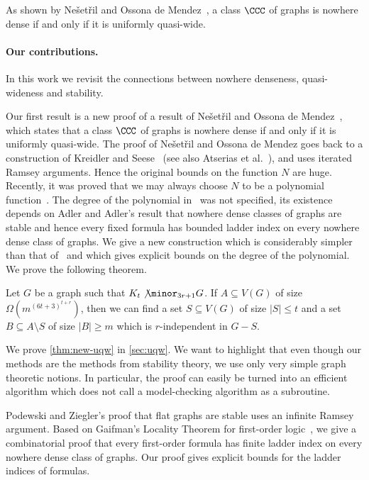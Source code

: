 As shown by Ne\v{s}et\v{r}il and Ossona de Mendez~\cite{nevsetvril2010first},
a class $\CCC$ of graphs is nowhere dense if and only if it
is uniformly quasi-wide.

\paragraph{Our contributions.} In this work we revisit the 
connections between nowhere denseness, quasi-wideness and
stability. 

Our first result is  a new proof of a result of
Ne\v{s}et\v{r}il and Ossona de Mendez~\cite{nevsetvril2010first},
which states that a class $\CCC$ of graphs is nowhere dense if and only if it
is uniformly quasi-wide. The proof of Ne\v{s}et\v{r}il 
and Ossona de Mendez goes back to a construction
of Kreidler and Seese~\cite{kreidler1998monadic} (see also Atserias et al.~\cite{atserias2006preservation}), 
and uses iterated Ramsey arguments. Hence the original bounds on 
the function $N$ are huge. Recently, 
it was proved that we may always choose $N$ to be a polynomial 
function~\cite{siebertz2016polynomial}. The degree of the polynomial 
in~\cite{siebertz2016polynomial} was  not specified, its existence 
depends on Adler and Adler's result that nowhere dense classes of graphs
are stable and hence every fixed formula has bounded ladder index 
on every nowhere dense class of graphs. We give a new construction 
which is considerably simpler than that of~\cite{siebertz2016polynomial}
and which gives explicit bounds on the degree of the polynomial. 
We prove the following theorem. 

\begin{theorem}\label{thm:new-uqw}
Let $G$ be a graph such that $K_t\not\minor_{3r+1} G$. 
If $A\subseteq V(G)$ of size $\Omega(m^{(6t+3)^{t+r}})$, then we can find a set
$S\subseteq V(G)$ of size $|S|\leq t$ and a set $B\subseteq A\setminus S$ 
of size $|B|\geq m$ which is $r$-independent in $G-S$.  
\end{theorem}

We prove \cref{thm:new-uqw} in \cref{sec:uqw}. We want to highlight
that even though our methods are the methods from stability theory, 
we use only very simple graph theoretic notions. In particular, the
proof can easily be turned into an efficient algorithm which does not
call a model-checking algorithm as a subroutine. 

\bigskip
Podewski and Ziegler's proof that flat graphs are stable uses an 
infinite Ramsey argument. Based on Gaifman's Locality Theorem for
first-order logic~\cite{gaifman1982local}, we give a combinatorial 
proof that every first-order formula has finite ladder index on every
nowhere dense class of graphs. Our proof gives explicit bounds for the
ladder indices of formulas. 

